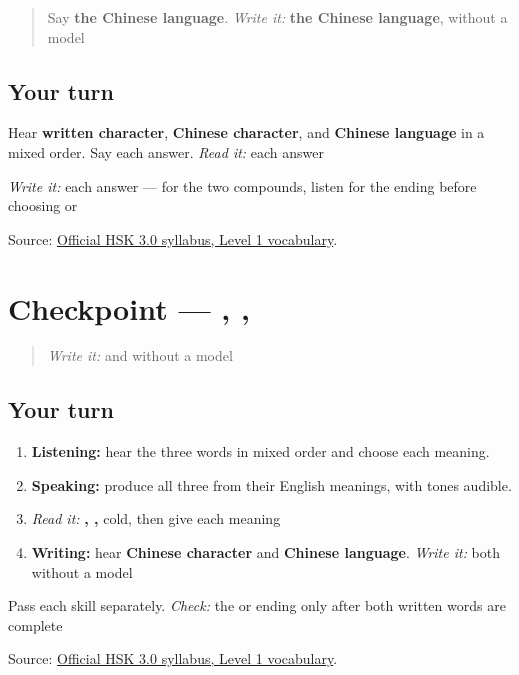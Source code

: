 \label{lesson:ZH-R16-identity-2}



\begin{quote}
Say \textbf{the Chinese language}. \emph{Write it:} \textbf{the Chinese language}, without a model
\end{quote}

\subsection*{Your turn}
Hear \textbf{written character}, \textbf{Chinese character}, and \textbf{Chinese language} in a mixed order. Say each answer. \emph{Read it:} each answer

\emph{Write it:} each answer — for the two  compounds, listen for the ending before choosing  or 

\begin{tcolorbox}[breakable,colback=teal!4,colframe=teal!35!black,title={Before you move on}]
Source: \href{https://hsk.cn-bj.ufileos.com/3.0/\%E6\%96\%B0\%E7\%89\%88HSK\%E8\%80\%83\%E8\%AF\%95\%E5\%A4\%A7\%E7\%BA\%B21219.pdf}{Official HSK 3.0 syllabus, Level 1 vocabulary}.
\end{tcolorbox}
\section[Practice]{Checkpoint — , , }

\label{lesson:ZH-C16-practice}



\begin{quote}
\emph{Write it:}  and  without a model
\end{quote}

\subsection*{Your turn}
\begin{enumerate}
\raggedright
  \item \textbf{Listening:} hear the three words in mixed order and choose each meaning.
  \item \textbf{Speaking:} produce all three from their English meanings, with tones audible.
  \item \emph{Read it:} \textbf{, , } cold, then give each meaning
  \item \textbf{Writing:} hear \textbf{Chinese character} and \textbf{Chinese language}. \emph{Write it:} both without a model
\end{enumerate}

Pass each skill separately. \emph{Check:} the  or  ending only after both written words are complete

\begin{tcolorbox}[breakable,colback=teal!4,colframe=teal!35!black,title={Before you move on}]
Source: \href{https://hsk.cn-bj.ufileos.com/3.0/\%E6\%96\%B0\%E7\%89\%88HSK\%E8\%80\%83\%E8\%AF\%95\%E5\%A4\%A7\%E7\%BA\%B21219.pdf}{Official HSK 3.0 syllabus, Level 1 vocabulary}.
\end{tcolorbox}

